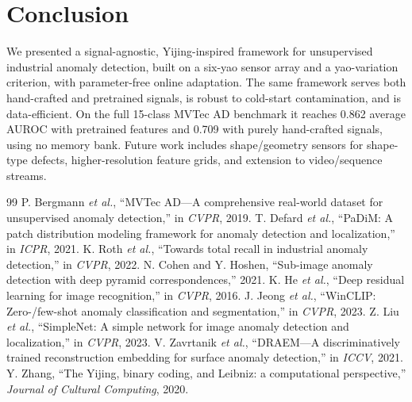 \documentclass[journal,10pt]{IEEEtran}
\begin{document}
\section{Conclusion}
We presented a signal-agnostic, Yijing-inspired framework for unsupervised
industrial anomaly detection, built on a six-yao sensor array and a
yao-variation criterion, with parameter-free online adaptation. The same
framework serves both hand-crafted and pretrained signals, is robust to
cold-start contamination, and is data-efficient. On the full 15-class
MVTec AD benchmark it reaches 0.862 average AUROC with pretrained features
and 0.709 with purely hand-crafted signals, using no memory bank. Future
work includes shape/geometry sensors for shape-type defects, higher-resolution
feature grids, and extension to video/sequence streams.


\begin{thebibliography}{99}
 P. Bergmann \emph{et al.}, ``MVTec AD---A
comprehensive real-world dataset for unsupervised anomaly detection,''
in \emph{CVPR}, 2019.
 T. Defard \emph{et al.}, ``PaDiM: A patch
distribution modeling framework for anomaly detection and localization,''
in \emph{ICPR}, 2021.
 K. Roth \emph{et al.}, ``Towards total recall
in industrial anomaly detection,'' in \emph{CVPR}, 2022.
 N. Cohen and Y. Hoshen, ``Sub-image anomaly
detection with deep pyramid correspondences,'' 2021.
 K. He \emph{et al.}, ``Deep residual learning for
image recognition,'' in \emph{CVPR}, 2016.
 J. Jeong \emph{et al.}, ``WinCLIP: Zero-/few-shot
anomaly classification and segmentation,'' in \emph{CVPR}, 2023.
 Z. Liu \emph{et al.}, ``SimpleNet: A simple
network for image anomaly detection and localization,'' in \emph{CVPR}, 2023.
 V. Zavrtanik \emph{et al.}, ``DRAEM---A
discriminatively trained reconstruction embedding for surface anomaly
detection,'' in \emph{ICCV}, 2021.
 Y. Zhang, ``The Yijing, binary coding, and Leibniz:
a computational perspective,'' \emph{Journal of Cultural Computing}, 2020.
\end{thebibliography}
\end{document}
